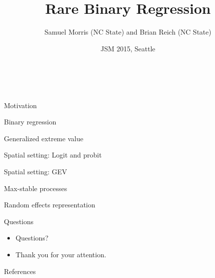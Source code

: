 \documentclass{beamer}
\title[Rare Binary Regression] %
{
  Rare Binary Regression
}
\author[S. Morris and B. Reich]{Samuel Morris (NC State) and Brian Reich (NC State)}
\institute[NCSU]{}
\date{JSM 2015, Seattle}
\begin{document}
\begin{frame}\frametitle{\ }
\begin{center}
	\maketitle
\end{center}
\end{frame}

\begin{frame}{Motivation}
\end{frame}

\begin{frame}{Binary regression}
\end{frame}

\begin{frame}{Generalized extreme value}
\end{frame}

\begin{frame}{Spatial setting: Logit and probit}
\end{frame}

\begin{frame}{Spatial setting: GEV}
\end{frame}

\begin{frame}{Max-stable processes}
\end{frame}

\begin{frame}{Random effects representation}
\end{frame}

\begin{frame}{Questions}
  \begin{itemize} \setlength{\itemsep}{0.5em}
    \item Questions?
    \item Thank you for your attention.
  \end{itemize}
\end{frame}

\begin{frame}{References}

\end{frame}
\end{document}
